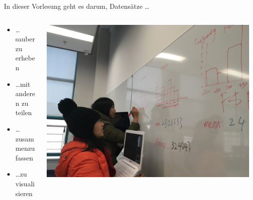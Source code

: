 \documentclass{beamer}
\begin{document}
\begin{frame}{In dieser Vorlesung geht es darum, Datensätze \dots}

\begin{columns}[c]
\begin{column}{5cm}

\begin{itemize}
    \item 
    \dots sauber zu erheben
    \item 
    \dots mit anderen zu teilen
    \item 
    \dots zusammenzufassen
    \item 
    \dots zu visualisieren
\end{itemize}

\end{column}

\begin{column}{5cm}
\includegraphics[width=\textwidth]{students_drawing_histograms.jpg}

\end{column}


\end{columns}


\end{frame}


 
\end{document}
